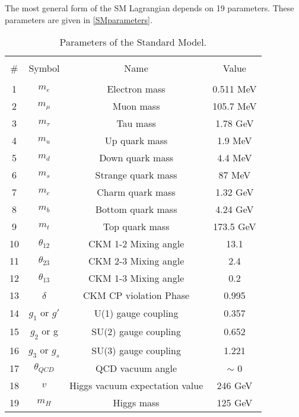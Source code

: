 The most general form of the SM Lagrangian depends on 19 parameters. These parameters are given in \autoref{SMparameters}.
\begin{table*}[h]
	{\setlength{\tabcolsep}{14pt}
		\caption{Parameters of the Standard Model.}
		\begin{center}
			\vspace{-6mm}
			\begin{tabular}{cccc}
				\hline \\[-2.45ex] \hline \\[-2.1ex]
				\# & Symbol & Name & Value \\
				\hline \\[-1.8ex]
				1 & $m_e$ & Electron mass & 0.511 MeV \\
				2 & $m_\mu$ & Muon mass & 105.7 MeV \\
				3 & $m_\tau$ & Tau mass & 1.78 GeV \\
				4 & $m_u$ & Up quark mass & 1.9 MeV \\
				5 & $m_d$ & Down quark mass & 4.4 MeV \\
				6 & $m_s$ & Strange quark mass & 87 MeV \\
				7 & $m_c$ & Charm quark mass & 1.32 GeV \\
				8 & $m_b$ & Bottom quark mass & 4.24 GeV \\
				9 & $m_t$ & Top quark mass & 173.5 GeV \\
				10 & $\theta_{12}$ & CKM 1-2 Mixing angle & 13.1\textdegree \\
				11 & $\theta_{23}$ & CKM 2-3 Mixing angle & 2.4\textdegree \\
				12 & $\theta_{13}$ & CKM 1-3 Mixing angle & 0.2\textdegree \\
				13 & $\delta$ & CKM CP violation Phase & 0.995 \\
				14 & $g_1$ or $g\prime$ & U(1) gauge coupling & 0.357 \\
				15 & $g_2$ or g & SU(2) gauge coupling & 0.652 \\
				16 & $g_3$ or $g_s$ & SU(3) gauge coupling & 1.221 \\
				17 & $\theta_{QCD}$ & QCD vacuum angle & $\sim $ 0 \\
				18 & $v$ & Higgs vacuum expectation value & 246 GeV \\
				19 & $m_H$ & Higgs mass & 125 GeV \\
				\hline
			\end{tabular}
			\vspace{-6mm}
		\end{center}
		\label{SMparameters}}
\end{table*}

